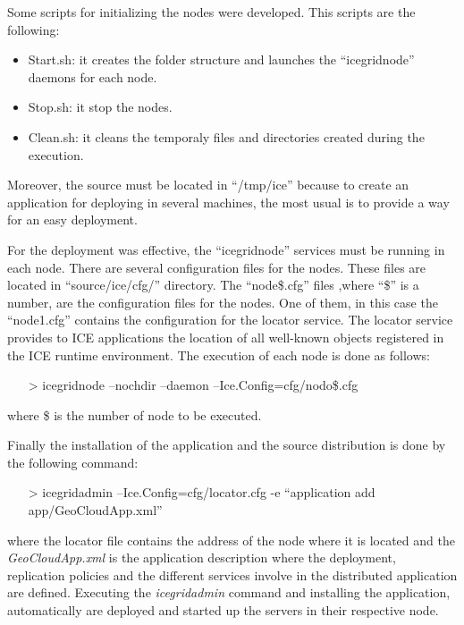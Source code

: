 Some scripts for initializing the nodes were developed. This scripts are the
following: 
\begin{itemize}
\item Start.sh: it creates the folder structure and launches the
  ``icegridnode'' daemons for each node.
\item Stop.sh: it stop the nodes.
\item Clean.sh: it cleans the temporaly files and directories created during the execution.
\end{itemize}

Moreover, the source must be located in ``/tmp/ice'' because to create an application for
deploying in several machines, the most usual is to provide a way for an easy
deployment. 

For the deployment was effective, the ``icegridnode'' services must be running
in each node. 
There are several configuration files for the nodes. These files are located in
``source/ice/cfg/'' directory. The ``node\$.cfg'' files ,where ``\$'' is a number,
are the configuration files for the nodes. One of them, in this case the
``node1.cfg'' contains the configuration for the locator service. 
The locator service provides to ICE applications the location of all well-known
objects registered in the ICE runtime environment. 
The execution of each node is done as follows:
\begin{itemize}
\item[>]icegridnode --nochdir --daemon --Ice.Config=cfg/nodo\$.cfg
\end{itemize}
where \$ is the number of node to be executed.
 
Finally the installation of the application and the source distribution is done
by the following command:
\begin{itemize}
\item[>]icegridadmin --Ice.Config=cfg/locator.cfg -e ``application add
  app/GeoCloudApp.xml''
\end{itemize}

where the locator file contains the address of the node where it is located and
the \emph{GeoCloudApp.xml} is the application description where the deployment,
replication policies and the different services involve in the distributed
application are defined. Executing the \emph{icegridadmin} command and
installing the application, automatically are deployed and started up the
servers in their respective node.

